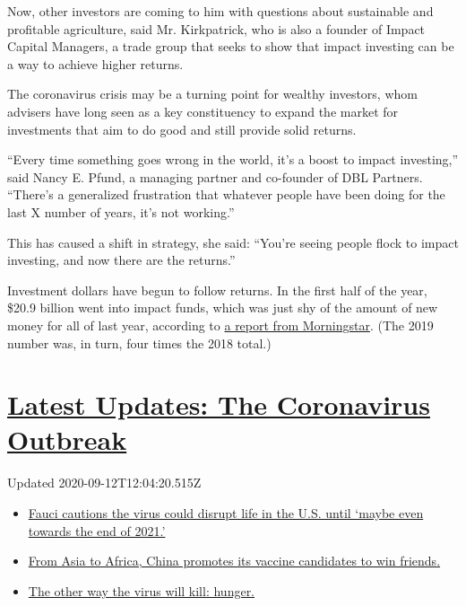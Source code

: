 Now, other investors are coming to him with questions about sustainable
and profitable agriculture, said Mr. Kirkpatrick, who is also a founder
of Impact Capital Managers, a trade group that seeks to show that impact
investing can be a way to achieve higher returns.

The coronavirus crisis may be a turning point for wealthy investors,
whom advisers have long seen as a key constituency to expand the market
for investments that aim to do good and still provide solid returns.

``Every time something goes wrong in the world, it's a boost to impact
investing,'' said Nancy E. Pfund, a managing partner and co-founder of
DBL Partners. ``There's a generalized frustration that whatever people
have been doing for the last X number of years, it's not working.''

This has caused a shift in strategy, she said: ``You're seeing people
flock to impact investing, and now there are the returns.''

Investment dollars have begun to follow returns. In the first half of
the year, \$20.9 billion went into impact funds, which was just shy of
the amount of new money for all of last year, according to
\href{https://www.morningstar.com/articles/994219/sustainable-funds-continue-to-rake-in-assets-during-the-second-quarter}{a
report from Morningstar}. (The 2019 number was, in turn, four times the
2018 total.)

\hypertarget{latest-updates-the-coronavirus-outbreak}{%
\section{\texorpdfstring{\href{https://www.nytimes3xbfgragh.onion/2020/09/11/world/covid-19-coronavirus.html?action=click\&pgtype=Article\&state=default\&region=MAIN_CONTENT_1\&context=storylines_live_updates}{Latest
Updates: The Coronavirus
Outbreak}}{Latest Updates: The Coronavirus Outbreak}}\label{latest-updates-the-coronavirus-outbreak}}

Updated 2020-09-12T12:04:20.515Z

\begin{itemize}
\tightlist
\item
  \href{https://www.nytimes3xbfgragh.onion/2020/09/11/world/covid-19-coronavirus.html?action=click\&pgtype=Article\&state=default\&region=MAIN_CONTENT_1\&context=storylines_live_updates\#link-dfb8a16}{Fauci
  cautions the virus could disrupt life in the U.S. until `maybe even
  towards the end of 2021.'}
\item
  \href{https://www.nytimes3xbfgragh.onion/2020/09/11/world/covid-19-coronavirus.html?action=click\&pgtype=Article\&state=default\&region=MAIN_CONTENT_1\&context=storylines_live_updates\#link-7104d154}{From
  Asia to Africa, China promotes its vaccine candidates to win friends.}
\item
  \href{https://www.nytimes3xbfgragh.onion/2020/09/11/world/covid-19-coronavirus.html?action=click\&pgtype=Article\&state=default\&region=MAIN_CONTENT_1\&context=storylines_live_updates\#link-393ad215}{The
  other way the virus will kill: hunger.}
\end{itemize}

